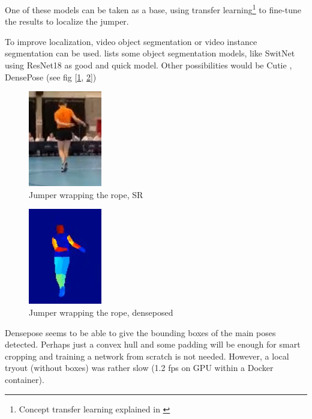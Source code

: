 One of these models can be taken as a base, using transfer learning\footnote{Concept transfer learning explained in \autocite{Bharadiya_2023}} to fine-tune the results to localize the jumper.

To improve localization, video object segmentation or video instance segmentation can be used. \textcite{Gao_2022} lists some object segmentation models, like SwitNet \textcite{Wang_2021} using ResNet18 as good and quick model.
Other possibilities would be Cutie \autocite{Cheng_2023}, DensePose (see fig [\ref{fig:srwrap}, \ref{fig:srwrapdense}]) \autocite{Guler_2018}

\begin{figure}
    \centering
    \includegraphics[width=0.3\linewidth]{img/sr_wrap}
    \caption{Jumper wrapping the rope, SR}
    \label{fig:srwrap}
\end{figure}

\begin{figure}
    \centering
    \includegraphics[width=0.3\linewidth]{img/sr_wrap_dense}
    \caption{Jumper wrapping the rope, denseposed}
    \label{fig:srwrapdense}
\end{figure}

Densepose seems to be able to give the bounding boxes of the main poses detected. Perhaps just a convex hull and some padding will be enough for smart cropping and training a network from scratch is not needed. However, a local tryout (without boxes) was rather slow (1.2 fps on GPU within a Docker container).

